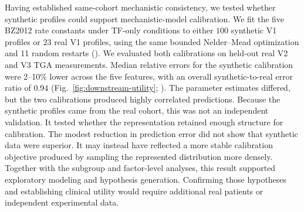 Having established same-cohort mechanistic consistency, we tested whether synthetic profiles
could support mechanistic-model calibration. We fit the
five BZ2012 rate constants under TF-only conditions to either $100$ synthetic V1 profiles or
$23$ real V1 profiles, using the same bounded Nelder--Mead optimization and 11 random restarts
(). We evaluated both calibrations on held-out real V2 and V3
TGA measurements. Median relative errors for the synthetic calibration were 2--10\% lower
across the five features, with an overall synthetic-to-real error ratio of $0.94$
(Fig.~\ref{fig:downstream-utility}; ). The parameter
estimates differed, but the two calibrations produced highly correlated predictions. Because
the synthetic profiles came from the real cohort, this was not an independent validation. It
tested whether the representation retained enough structure for calibration.
The modest reduction in prediction error did not show that synthetic data were
superior. It may instead have reflected a more stable calibration objective produced by
sampling the represented distribution more densely. Together with the subgroup and
factor-level analyses, this result supported exploratory modeling and hypothesis generation.
Confirming those hypotheses and establishing clinical utility would require additional real
patients or independent experimental data.
